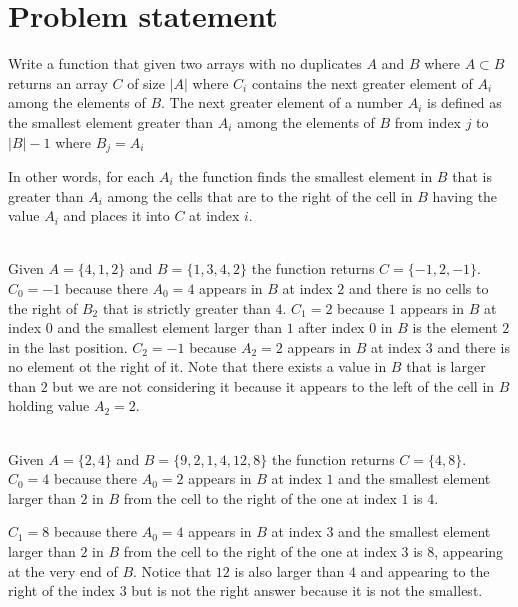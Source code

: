 \section{Problem statement}
\begin{exercise}
\label{example:next_greater_element:exercice1}
Write a function that given two arrays with no duplicates $A$ and $B$ 
where $A \subset B$
returns an array $C$ of size $|A|$ where $C_i$ 
contains the next greater element of $A_i$ among the elements of $B$.
The next greater element of a number $A_i$ is defined
as the smallest element greater than $A_i$ among the elements of 
$B$ from index $j$ to $|B|-1$ where $B_j = A_i$

In other words, for each $A_i$ the function 
finds the smallest element in $B$ that is greater than $A_i$ 
among the cells that are to the right
of the cell in $B$ having the value $A_i$ and places it into 
$C$ at index $i$.

	\begin{example}
		\label{example:next_greater_element:example1}
		\hfill \\
		Given $A=\{4,1,2\}$ and $B=\{1,3,4,2\}$ the function returns $C=\{-1,2,-1\}$.
		$C_0 = -1$ because there $A_0 = 4$ appears in $B$ at index $2$ 
		and there is no cells to the right of $B_2$ that is strictly greater than $4$.
		$C_1 = 2$ because $1$ appears in $B$ at index $0$ and the smallest element larger than $1$ after index $0$ in $B$ is the element $2$ in the last position.
		$C_2 = -1$ because $A_2 = 2$ appears in $B$ at index $3$ and there is no element ot the right of it.
		Note that there exists a value in $B$ that is larger than $2$ but we are not considering it because it appears to the left
		of the cell in $B$ holding value $A_2=2$.
		
	\end{example}

	\begin{example}
		\label{example:next_greater_element:example2}
		\hfill \\
		Given $A=\{2,4\}$ and $B=\{9,2,1,4,12,8\}$ the function returns $C=\{4,8\}$.
		$C_0 = 4$ because there $A_0 = 2$ appears in $B$ at index $1$ 
		and  the smallest element larger than $2$ in $B$ from the cell to the right of the one at index $1$ is $4$.
		
		$C_1 = 8$ because there $A_0 = 4$ appears in $B$ at index $3$ 
		and  the smallest element larger than $2$ in $B$ from the cell to the right of the one at index $3$ is $8$, appearing at the very end of $B$.
		Notice that $12$ is also larger than $4$ and appearing to the right of the index $3$ but is not the right answer because it is not the smallest.
	\end{example}
\end{exercise}

